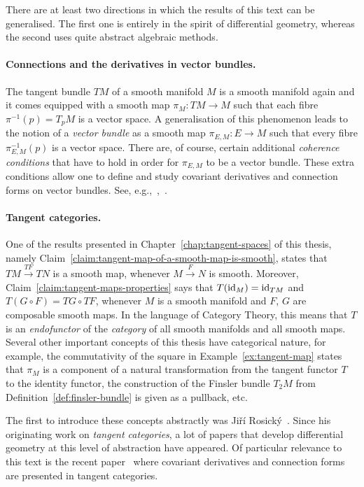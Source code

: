 \documentclass[11pt,a4paper,twoside,openany]{report}
\theoremstyle{my-theorem}
\theoremstyle{non-theorem}
\begin{document}
		There are at least two directions in which the results of this text can be generalised. The first one is entirely in the spirit of differential geometry, whereas the second uses quite abstract algebraic methods.
		
		\paragraph*{Connections and the derivatives in vector bundles.} The tangent bundle $TM$ of a smooth manifold $M$ is a smooth manifold again and it comes equipped with a smooth map $\pi_M : TM \to M$ such that each fibre $\pi^{-1}(p) = T_pM$ is a vector space. A generalisation of this phenomenon leads to the notion of a \emph{vector bundle} as a smooth map $\pi_{E,M}: E \to M$ such that every fibre $\pi_{E,M}^{-1}(p)$ is a vector space. There are, of course, certain additional \emph{coherence conditions} that have to hold in order for $\pi_{E,M}$ to be a vector bundle. These extra conditions allow one to define and study covariant derivatives and connection forms on vector bundles. See, e.g.,~\cite{lee:manifolds-and-differential-geometry},~\cite{szilasi-kertesz-lovas:connections-sprays-and-finsler-structures}.
		
		\paragraph{Tangent categories.} One of the results presented in Chapter~\ref{chap:tangent-spaces} of this thesis, namely Claim~\ref{claim:tangent-map-of-a-smooth-map-is-smooth}, states that $TM \xrightarrow{TF} TN$ is a smooth map, whenever $M \xrightarrow{F} N$ is smooth. Moreover, Claim~\ref{claim:tangent-maps-properties} says that $T(\operatorname{id}_M) = \operatorname{id}_{TM}$ and $T(G \circ F) = TG \circ TF$, whenever $M$ is a smooth manifold and $F$, $G$ are composable smooth maps. In the language of Category Theory, this means that $T$ is an \emph{endofunctor} of the \emph{category} of all smooth manifolds and all smooth maps. Several other important concepts of this thesis have categorical nature, for example, the commutativity of the square in Example~\ref{ex:tangent-map} states that $\pi_M$ is a component of a natural transformation from the tangent functor $T$ to the identity functor, the construction of the Finsler bundle $T_2M$ from Definition~\ref{def:finsler-bundle} is given as a pullback, etc.
		
		The first to introduce these concepts abstractly was Jiří Rosický~\cite{rosicky:abstract-tangent-functors}. Since his originating work on \emph{tangent categories}, a lot of papers that develop differential geometry at this level of abstraction have appeared. Of particular relevance to this text is the recent paper~\cite{lucyshyn-wright:on-geometric-noton-of-connection-and-its-expression-in-tangent-categories} where covariant derivatives and connection forms are presented in tangent categories.
			
\end{document}
